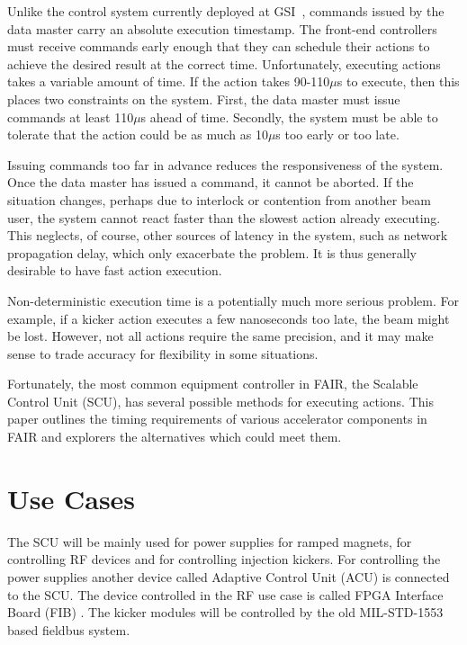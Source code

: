 \documentclass{JAC2003}
\begin{document}
Unlike the control system currently deployed at GSI~\cite{old-gsi},
commands issued by the data master carry an absolute execution timestamp.
The front-end controllers must receive commands early enough 
that they can schedule their actions 
to achieve the desired result at the correct time.
Unfortunately, executing actions takes a variable amount of time.
If the action takes 90-110$\mu$s to execute, 
then this places two constraints on the system.
First, the data master must issue commands at least 110$\mu$s ahead of time.
Secondly, the system must be able to tolerate that the action could be as
much as 10$\mu$s too early or too late.

Issuing commands too far in advance reduces the responsiveness of the system.
Once the data master has issued a command, it cannot be aborted.
If the situation changes,
perhaps due to interlock or contention from another beam user,
the system cannot react faster than the slowest action already executing.
This neglects, of course, other sources of latency in the system,
such as network propagation delay, which only exacerbate the problem.
It is thus generally desirable to have fast action execution.

Non-deterministic execution time is a potentially much more serious problem.
For example, if a kicker action executes a few nanoseconds too late,
the beam might be lost.
However, not all actions require the same precision,
and it may make sense to trade accuracy for flexibility in some situations.

Fortunately, the  most common equipment controller in FAIR, 
the Scalable Control Unit (SCU),
has several possible methods for executing actions.
This paper outlines the timing requirements of various accelerator
components in FAIR and explorers the alternatives which could meet them.

\section{Use Cases}
The SCU will be mainly used for power supplies for ramped magnets, for controlling
RF devices and for controlling injection kickers.
For controlling the power supplies another device called Adaptive Control
Unit (ACU) \cite{acuref} is connected to the SCU. The device controlled in
the RF use case is called FPGA Interface Board (FIB) \cite{fibref}.
The kicker modules will be controlled by the old MIL-STD-1553 based fieldbus system.
\end{document}
